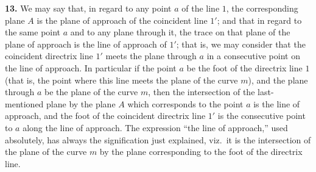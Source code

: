 \documentclass[11pt,a4paper]{article}
\begin{document}
\textbf{13.} We may say that, in regard to any point $a$ of the line $1$, the corresponding plane $A$ is the plane of approach of the coincident line $1'$; and that in regard to the same point $a$ and to any plane through it, the trace on that plane of the plane of approach is the line of approach of $1'$; that is, we may consider that the coincident directrix line $1'$ meets the plane through $a$ in a consecutive point on the line of approach. In particular if the point $a$ be the foot of the directrix line $1$ (that is, the point where this line meets the plane of the curve $m$), and the plane through $a$ be the plane of the curve $m$, then the intersection of the last-mentioned plane by the plane $A$ which corresponds to the point $a$ is the line of approach, and the foot of the coincident directrix line $1'$ is the consecutive point to $a$ along the line of approach. The expression ``the line of approach,'' used absolutely, has always the signification just explained, viz.\ it is the intersection of the plane of the curve $m$ by the plane corresponding to the foot of the directrix line.

\medskip
\end{document}
